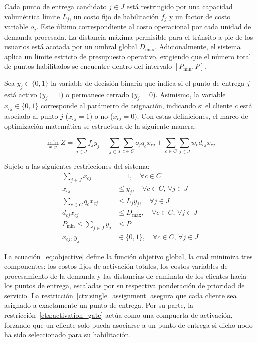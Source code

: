 \documentclass[final,5p,times,twocolumn]{elsarticle}
\begin{document}
Cada punto de entrega candidato $j \in J$ está restringido por una capacidad volumétrica límite $L_j$, un costo fijo de habilitación $f_j$ y un factor de costo variable $o_j$. Este último correspondiente al costo operacional por cada unidad de demanda procesada. La distancia máxima permisible para el tránsito a pie de los usuarios está acotada por un umbral global $D_{\max}$. Adicionalmente, el sistema aplica un límite estricto de presupuesto operativo, exigiendo que el número total de puntos habilitados se encuentre dentro del intervalo $[P_{\min}, P]$.

Sea $y_j \in \{0, 1\}$ la variable de decisión binaria que indica si el punto de entrega $j$ está activo ($y_j = 1$) o permanece cerrado ($y_j = 0$). Asimismo, la variable $x_{cj} \in \{0, 1\}$ corresponde al parámetro de asignación, indicando si el cliente $c$ está asociado al punto $j$ ($x_{cj} = 1$) o no ($x_{cj} = 0$). Con estas definiciones, el marco de optimización matemática se estructura de la siguiente manera:

\begin{equation}
\min_{x, y} Z = \sum_{j \in J} f_j y_j + \sum_{j \in J} \sum_{c \in C} o_j q_c x_{cj} + \sum_{c \in C} \sum_{j \in J} w_c d_{cj} x_{cj}
\label{eq:objective}
\end{equation}

Sujeto a las siguientes restricciones del sistema:
\begin{align}
\sum_{j \in J} x_{cj} &= 1, \quad \forall c \in C \label{ctx:single_assignment} \\
x_{cj} &\le y_j, \quad \forall c \in C, \, \forall j \in J \label{ctx:activation_gate} \\
\sum_{c \in C} q_c x_{cj} &\le L_j y_j, \quad \forall j \in J \label{ctx:capacity} \\
d_{cj} x_{cj} &\le D_{\max}, \quad \forall c \in C, \, \forall j \in J \label{ctx:distance} \\
P_{\min} \le \sum_{j \in J} y_j &\le P \label{ctx:hub_bounds} \\
x_{cj}, y_j &\in \{0, 1\}, \quad \forall c \in C, \, \forall j \in J \label{ctx:binary}
\end{align}

La ecuación~\eqref{eq:objective} define la función objetivo global, la cual minimiza tres componentes: los costos fijos de activación totales, los costos variables de procesamiento de la demanda y las distancias de caminata de los clientes hacia los puntos de entrega, escaladas por su respectiva ponderación de prioridad de servicio.
La restricción~\eqref{ctx:single_assignment} asegura que cada cliente sea asignado a exactamente un punto de entrega.
Por su parte, la restricción~\eqref{ctx:activation_gate} actúa como una compuerta de activación, forzando que un cliente solo pueda asociarse a un punto de entrega si dicho nodo ha sido seleccionado para su habilitación. 
\end{document}
